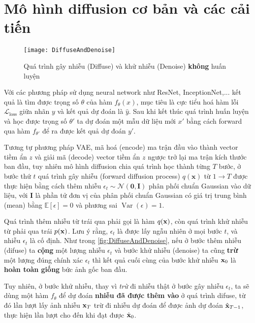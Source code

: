 \section{Mô hình diffusion cơ bản và các cải tiến}
\label{sec:summary_diffusion}


\begin{figure}[H]
	\centering
	\texttt{[image: DiffuseAndDenoise]}
	\caption{Quá trình gây nhiễu (Diffuse) và khử nhiễu (Denoise) \textbf{không} huấn luyện}
	\label{fig:DiffuseAndDenoise}
\end{figure}

Với các phương pháp sử dụng neural network như ResNet, InceptionNet,... kết quả là tìm được trọng số $\theta$ của hàm $f_{\theta}(x)$, mục tiêu là cực tiểu hoá hàm lỗi $\mathcal{L}_\text{loss}$ giữa nhãn $y$ và kết quả dự đoán là $\hat{y}$. Sau khi kết thúc quá trình huấn luyện và học được trọng số $\theta'$ ta dự đoán một mẫu dữ liệu mới $x'$ bằng cách forward qua hàm $f_{\theta'}$ để ra được kết quả dự đoán $y'$.

Tương tự phương pháp VAE, mã hoá (encode) ma trận đầu vào thành vector tiềm ẩn $z$ và giải mã (decode) vector tiềm ẩn $z$ ngược trở lại ma trận kích thước ban đầu, tuy nhiên mô hình diffusion chia quá trình học thành từng $T$ bước, ở bước thứ $t$ quá trình gây nhiễu (forward diffusion process) $q(\mathbf{x})$ từ $1 \to T$ được thực hiện bằng cách thêm nhiễu $\epsilon_{t} \sim \mathcal{N} (\mathbf{0}, \mathbf{I})$ phân phối chuẩn Gaussian vào dữ liệu, với $\mathbf{I}$ là phần tử đơn vị của phân phối chuẩn Gaussian có giá trị trung bình  (mean) bằng $\mathbb{E}[\epsilon]=0$ và phương sai $\operatorname{Var}(\epsilon)=1$.


Quá trình thêm nhiễu từ trái qua phải gọi là hàm $q(\mathbf{x})$, còn quá trình khử nhiễu từ phải qua trái $p(\mathbf{x})$. Lưu ý rằng, $\epsilon_t$ là được lấy ngẫu nhiên ở mọi bước $t$, và nhiễu $\epsilon_t$ là cố định. Như trong \autoref{fig:DiffuseAndDenoise}, nếu ở bước thêm nhiễu (difuse) ta \textbf{cộng} một lượng nhiễu $\epsilon_t$ và bước khử nhiễu (denoise) ta cũng \textbf{trừ} một lượng đúng chính xác $\epsilon_t$ thì kết quả cuối cùng của bước khử nhiễu $\mathbf{x}_0$ là \textbf{hoàn toàn giống} bức ảnh gốc ban đầu.

Tuy nhiên, ở bước khử nhiễu, thay vì \textit{trừ} đi nhiễu thật ở bước gây nhiễu $\epsilon_t$, ta sẽ dùng một hàm $f_{\theta}$ để dự đoán \textbf{nhiễu đã được thêm vào} ở quá trình difuse, từ đó lần lượt lấy ảnh nhiễu $\mathbf{x}_T$ trừ đi nhiễu dự đoán để được ảnh dự đoán $\hat{\mathbf{x}}_{T-1}$, thực hiện lần lượt cho đến khi đạt được $\hat{\mathbf{x}}_0$.

